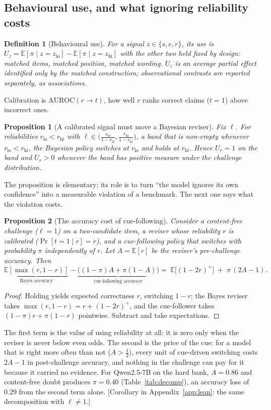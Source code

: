 \documentclass{article}
\newcommand{\pending}[1]{\textcolor{blue!70!black}{[#1]}}
\newtheorem{proposition}{Proposition}
\newtheorem{definition}{Definition}
\newcommand{\Uz}[1]{U_{#1}}
\begin{document}
\subsection{Behavioural use, and what ignoring reliability costs}
\begin{definition}[Behavioural use]\label{def:use}
For a signal $z\in\{s,e,r\}$, its use is $\Uz{z}=\mathbb{E}[\pi\mid z=z_{\mathrm{lo}}]-\mathbb{E}[\pi\mid z=z_{\mathrm{hi}}]$ with the other two held fixed by design: matched items, matched position, matched wording. $\Uz{z}$ is an average partial effect identified only by the matched construction; observational contrasts are reported separately, as associations.
\end{definition}
Calibration is $\mathrm{AUROC}(r\to t)$, how well $r$ ranks correct claims ($t=1$) above incorrect ones.
\begin{proposition}[A calibrated signal must move a Bayesian reviser]\label{prop:bayes}
Fix $\ell$. For reliabilities $r_{\mathrm{lo}}<r_{\mathrm{hi}}$ with $\ell\in\big(\tfrac{r_{\mathrm{lo}}}{1-r_{\mathrm{lo}}},\tfrac{r_{\mathrm{hi}}}{1-r_{\mathrm{hi}}}\big)$, a band that is non-empty whenever $r_{\mathrm{lo}}<r_{\mathrm{hi}}$, the Bayesian policy switches at $r_{\mathrm{lo}}$ and holds at $r_{\mathrm{hi}}$. Hence $\Uz{r}=1$ on the band and $\Uz{r}>0$ whenever the band has positive measure under the challenge distribution.
\end{proposition}
The proposition is elementary; its role is to turn ``the model ignores its own confidence'' into a measurable violation of a benchmark. The next one says what the violation costs.
\begin{proposition}[The accuracy cost of cue-following]\label{prop:regret}
Consider a content-free challenge ($\ell=1$) on a two-candidate item, a reviser whose reliability $r$ is calibrated ($\Pr[t=1\mid r]=r$), and a cue-following policy that switches with probability $\pi$ independently of $r$. Let $A=\mathbb{E}[r]$ be the reviser's pre-challenge accuracy. Then
\[
\underbrace{\mathbb{E}[\max(r,1-r)]}_{\text{Bayes accuracy}}-\underbrace{\big((1-\pi)A+\pi(1-A)\big)}_{\text{cue-following accuracy}}
=\;\mathbb{E}\big[(1-2r)^{+}\big]\;+\;\pi\,(2A-1).
\]
\end{proposition}
\begin{proof}
Holding yields expected correctness $r$, switching $1-r$; the Bayes reviser takes $\max(r,1-r)=r+(1-2r)^{+}$, and the cue-follower takes $(1-\pi)r+\pi(1-r)$ pointwise. Subtract and take expectations.
\end{proof}
The first term is the value of using reliability at all: it is zero only when the reviser is never below even odds. The second is the price of the cue: for a model that is right more often than not ($A>\tfrac12$), every unit of cue-driven switching costs $2A-1$ in post-challenge accuracy, and nothing in the challenge can pay for it because it carried no evidence. For Qwen2.5-7B on the hard bank, $A=0.86$ and content-free doubt produces $\pi=0.40$ (Table~\ref{tab:decomp}), an accuracy loss of $0.29$ from the second term alone. \pending{Corollary in Appendix~\ref{app:lean}: the same decomposition with $\ell\neq1$.}
\end{document}
